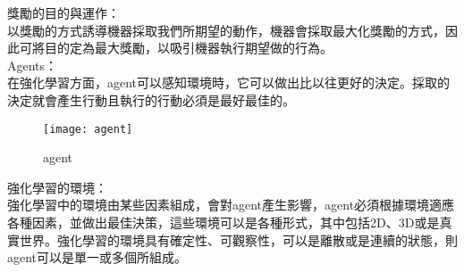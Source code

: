 獎勵的目的與運作：\\
 以獎勵的方式誘導機器採取我們所期望的動作，機器會採取最大化獎勵的方式，因此可將目的定為最大獎勵，以吸引機器執行期望做的行為。\\
 
Agents：\\
 在強化學習方面，agent可以感知環境時，它可以做出比以往更好的決定。採取的決定就會產生行動且執行的行動必須是最好最佳的。\\[12pt]
\begin{figure}[hbt!]
\begin{center}
\texttt{[image: agent]}
\caption{\Large agent}
\label{agent}
\end{center}
\end{figure}
強化學習的環境：\\
 強化學習中的環境由某些因素組成，會對agent產生影響，agent必須根據環境適應各種因素，並做出最佳決策，這些環境可以是各種形式，其中包括2D、3D或是真實世界。強化學習的環境具有確定性、可觀察性，可以是離散或是連續的狀態，則agent可以是單一或多個所組成。\\
